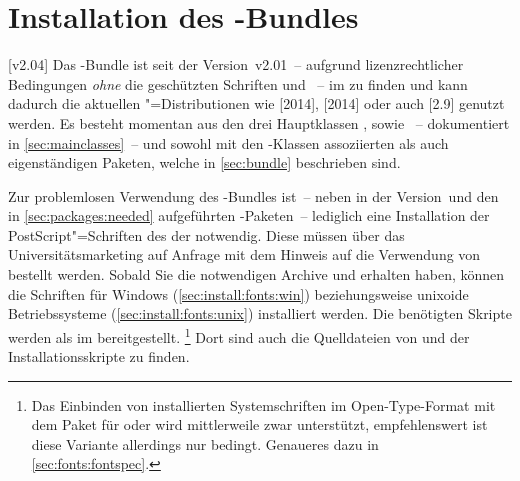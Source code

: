 \section{Installation des \TUDScript-Bundles}
\label{sec:install}%
%
%
%
[v2.04]
Das \TUDScript-Bundle ist seit der Version~v2.01~-- aufgrund lizenzrechtlicher 
Bedingungen \emph{ohne} die geschützten Schriften \Univers und \DIN~-- im 
\foreignlanguage{english}{%
} zu finden und kann dadurch die aktuellen "=Distributionen wie 
[2014], [2014] 
oder auch [2.9] genutzt werden. Es besteht 
momentan aus den drei Hauptklassen ,  
sowie ~-- dokumentiert in \autoref{sec:mainclasses}~-- und 
sowohl mit den \TUDScript-Klassen assoziierten als auch eigenständigen Paketen, 
welche in \autoref{sec:bundle} beschrieben sind.

Zur problemlosen Verwendung des \TUDScript-Bundles ist~-- neben \KOMAScript{} in
der Version~\vKOMAScript und den in \autoref{sec:packages:needed} aufgeführten 
-Paketen~-- lediglich eine Installation der PostScript"=Schriften 
des \CDs der \TnUD notwendig. Diese müssen über das Universitätsmarketing auf 
%
{Anfrage} mit dem Hinweis auf die Verwendung von  bestellt 
werden. Sobald Sie die notwendigen Archive  und 
 erhalten haben, können die Schriften für Windows 
(\autoref{sec:install:fonts:win}) beziehungsweise unixoide Betriebssysteme 
(\autoref{sec:install:fonts:unix}) installiert werden. Die benötigten Skripte 
werden als  
im \GitHubRepo* bereitgestellt.%
\footnote{%
  Das Einbinden von installierten Systemschriften im Open-Type-Format mit dem 
  Paket  für  oder  wird 
  mittlerweile zwar unterstützt, empfehlenswert ist diese Variante allerdings 
  nur bedingt. Genaueres dazu in \autoref{sec:fonts:fontspec}.%
}
Dort sind auch die Quelldateien von \TUDScript und der Installationsskripte zu 
finden.

